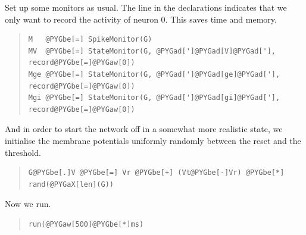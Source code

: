 \documentclass[letterpaper,10pt]{manual}
\begin{document}
Set up some monitors as usual. The line  in the \hyperlink{brian.StateMonitor}{}
declarations indicates that we only want to record the activity of
neuron 0. This saves time and memory.
\begin{quote}

\begin{Verbatim}[commandchars=@\[\]]
M   @PYGbe[=] SpikeMonitor(G)
MV  @PYGbe[=] StateMonitor(G, @PYGad[']@PYGad[V]@PYGad['], record@PYGbe[=]@PYGaw[0])
Mge @PYGbe[=] StateMonitor(G, @PYGad[']@PYGad[ge]@PYGad['], record@PYGbe[=]@PYGaw[0])
Mgi @PYGbe[=] StateMonitor(G, @PYGad[']@PYGad[gi]@PYGad['], record@PYGbe[=]@PYGaw[0])
\end{Verbatim}
\end{quote}

And in order to start the network off in a somewhat
more realistic state, we initialise the membrane
potentials uniformly randomly between the reset and
the threshold.
\begin{quote}

\begin{Verbatim}[commandchars=@\[\]]
G@PYGbe[.]V @PYGbe[=] Vr @PYGbe[+] (Vt@PYGbe[-]Vr) @PYGbe[*] rand(@PYGaX[len](G))
\end{Verbatim}
\end{quote}

Now we run.
\begin{quote}

\begin{Verbatim}[commandchars=@\[\]]
run(@PYGaw[500]@PYGbe[*]ms)
\end{Verbatim}
\end{quote}
\end{document}

